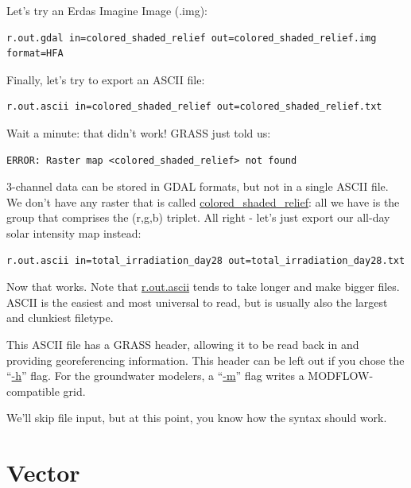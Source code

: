 \documentclass{book}
\begin{document}
Let's try an Erdas Imagine Image (.img):
\begin{lstlisting}
r.out.gdal in=colored_shaded_relief out=colored_shaded_relief.img format=HFA
\end{lstlisting}

Finally, let's try to export an ASCII file:
\begin{lstlisting}
r.out.ascii in=colored_shaded_relief out=colored_shaded_relief.txt
\end{lstlisting}
Wait a minute: that didn't work! GRASS just told us:
\begin{lstlisting}
ERROR: Raster map <colored_shaded_relief> not found
\end{lstlisting}
3-channel data can be stored in GDAL formats, but not in a single ASCII file. We don't have any raster that is called \url{colored_shaded_relief}: all we have is the group that comprises the (r,g,b) triplet. All right - let's just export our all-day solar intensity map instead:
\begin{lstlisting}
r.out.ascii in=total_irradiation_day28 out=total_irradiation_day28.txt
\end{lstlisting}
Now that works. Note that \url{r.out.ascii} tends to take longer and make bigger files. ASCII is the easiest and most universal to read, but is usually also the largest and clunkiest filetype.

This ASCII file has a GRASS header, allowing it to be read back in and providing georeferencing information. This header can be left out if you chose the ``\url{-h}'' flag. For the groundwater modelers, a ``\url{-m}'' flag writes a MODFLOW-compatible grid.

We'll skip file input, but at this point, you know how the syntax should work.

\section{Vector}
\end{document}
